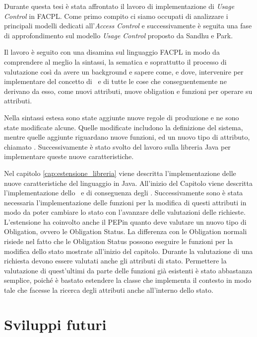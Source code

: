 \label{cap:conclusioni}
Durante questa tesi è stata affrontato il lavoro di implementazione di \textit{Usage Control} in \ac{FACPL}.
Come primo compito ci siamo occupati di analizzare i principali modelli dedicati all'\textit{Access Control} e successivamente è seguita una fase di approfondimento sul modello \textit{Usage Control} proposto da Sandhu e Park.  \par
Il lavoro è seguito con una disamina sul linguaggio \ac{FACPL} in modo da comprendere al meglio la sintassi, la sematica e soprattutto il processo di valutazione così da avere un background e sapere come, e dove, intervenire per implementare del concetto di \status \ e di tutte le cose che conseguentemente ne derivano da esso, come nuovi attributi, nuove obligation e funzioni per operare su attributi. \par
Nella sintassi estesa sono state aggiunte nuove regole di produzione e ne sono state modificate alcune. Quelle modificate includono la definizione del sistema, mentre quelle aggiunte riguardano nuove funzioni, ed un nuovo tipo di attributo, chiamato \statusattribute.
Successivamente è stato svolto del lavoro sulla libreria Java per implementare queste nuove caratteristiche. \par
Nel capitolo \ref{cap:estensione_libreria} viene descritta l'implementazione delle nuove caratteristiche del linguaggio in Java. All'inizio del Capitolo viene descritta l'implementazione dello \status \ e di conseguenza degli \statusattribute. Successivamente sono è stata necessaria  l'implementazione  delle funzioni per la modifica di questi attributi in modo da poter cambiare lo stato con l'avanzare delle valutazioni delle richieste. L'estensione ha coinvolto anche il \ac{PEP}in quanto deve valutare un nuovo tipo di Obligation, ovvero le Obligation Status.
La differenza con le Obligation normali risiede nel fatto che le Obligation Status possono eseguire le funzioni per la modifica dello stato mostrate all'inizio del capitolo.
Durante la valutazione di una richiesta devono essere valutati anche gli attributi di stato. Permettere la valutazione di quest'ultimi da parte delle funzioni già esistenti è stato abbastanza semplice, poiché è bastato estendere la classe che implementa il contesto in modo tale che facesse la ricerca degli attributi anche all'interno dello stato.

\section{Sviluppi futuri}
\label{sec:futuro}

